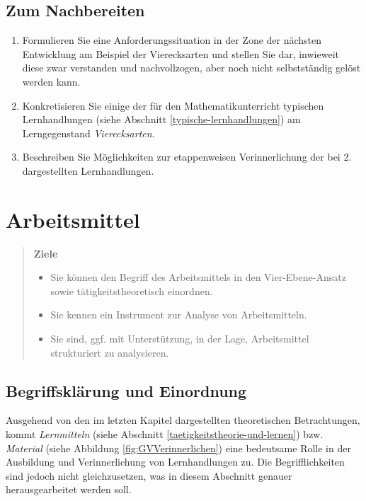 \documentclass[
]{scrbook}
\providecommand{\tightlist}{%
  \setlength{\itemsep}{0pt}\setlength{\parskip}{0pt}}
\theoremstyle{definition}
\theoremstyle{definition}
\theoremstyle{definition}
\theoremstyle{definition}
\theoremstyle{remark}
\begin{document}
\hypertarget{lerntaetigkeit-nachbereitung}{%
\section{Zum Nachbereiten}\label{lerntaetigkeit-nachbereitung}}

\begin{enumerate}
\def\labelenumi{\arabic{enumi}.}
\item
  Formulieren Sie eine Anforderungssituation in der Zone der nächsten Entwicklung am Beispiel der Vierecksarten und stellen Sie dar, inwieweit diese zwar verstanden und nachvollzogen, aber noch nicht selbstständig gelöst werden kann.
\item
  Konkretisieren Sie einige der für den Mathematikunterricht typischen Lernhandlungen (siehe Abschnitt \ref{typische-lernhandlungen}) am Lerngegenstand \emph{Vierecksarten}.
\item
  Beschreiben Sie Möglichkeiten zur etappenweisen Verinnerlichung der bei 2. dargestellten Lernhandlungen.
\end{enumerate}

\hypertarget{arbeitsmittel}{%
\chapter{Arbeitsmittel}\label{arbeitsmittel}}

\begin{quote}
\textbf{Ziele}

\begin{itemize}
\tightlist
\item
  Sie können den Begriff des Arbeitsmittels in den Vier-Ebene-Ansatz sowie tätigkeitstheoretisch einordnen.
\item
  Sie kennen ein Instrument zur Analyse von Arbeitsmitteln.
\item
  Sie sind, ggf. mit Unterstützung, in der Lage, Arbeitsmittel strukturiert zu analysieren.
\end{itemize}
\end{quote}

\hypertarget{begriffskluxe4rung-und-einordnung}{%
\section{Begriffsklärung und Einordnung}\label{begriffskluxe4rung-und-einordnung}}

Ausgehend von den im letzten Kapitel dargestellten theoretischen Betrachtungen, kommt \emph{Lernmitteln} (siehe Abschnitt \ref{taetigkeitstheorie-und-lernen}) bzw. \emph{Material} (siehe Abbildung \ref{fig:GVVerinnerlichen}) eine bedeutsame Rolle in der Ausbildung und Verinnerlichung von Lernhandlungen zu. Die Begrifflichkeiten sind jedoch nicht gleichzusetzen, was in diesem Abschnitt genauer herausgearbeitet werden soll.
\end{document}
